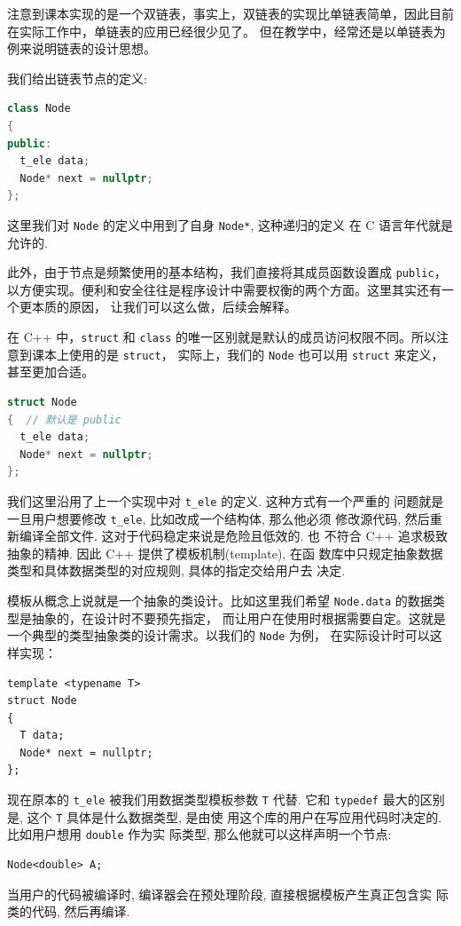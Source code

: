 \documentclass[a4paper]{ctexart}
\theoremstyle{definition}
\theoremstyle{definition}
\begin{document}
注意到课本实现的是一个双链表，事实上，双链表的实现比单链表简单，因此目前在实际工作中，单链表的应用已经很少见了。
但在教学中，经常还是以单链表为例来说明链表的设计思想。

我们给出链表节点的定义:
\begin{lstlisting}[language=C++]
class Node
{
public:
  t_ele data;
  Node* next = nullptr; 
};
\end{lstlisting}
这里我们对 \verb|Node| 的定义中用到了自身 \verb|Node*|, 这种递归的定义
在 C 语言年代就是允许的.

此外，由于节点是频繁使用的基本结构，我们直接将其成员函数设置成 \verb|public|，
以方便实现。便利和安全往往是程序设计中需要权衡的两个方面。这里其实还有一个更本质的原因，
让我们可以这么做，后续会解释。

在 C++ 中，\verb|struct| 和 \verb|class| 的唯一区别就是默认的成员访问权限不同。所以注意到课本上使用的是 \verb|struct|，
实际上，我们的 \verb|Node| 也可以用 \verb|struct| 来定义，甚至更加合适。

\begin{lstlisting}[language=C++]
struct Node
{  // 默认是 public
  t_ele data;
  Node* next = nullptr; 
};
\end{lstlisting}

我们这里沿用了上一个实现中对 \verb|t_ele| 的定义. 这种方式有一个严重的
问题就是一旦用户想要修改 \verb|t_ele|, 比如改成一个结构体, 那么他必须
修改源代码, 然后重新编译全部文件. 这对于代码稳定来说是危险且低效的. 也
不符合 C++ 追求极致抽象的精神. 因此 C++ 提供了模板机制(template), 在函
数库中只规定抽象数据类型和具体数据类型的对应规则, 具体的指定交给用户去
决定. 

模板从概念上说就是一个抽象的类设计。比如这里我们希望 \verb|Node.data| 的数据类型是抽象的，在设计时不要预先指定，
而让用户在使用时根据需要自定。这就是一个典型的类型抽象类的设计需求。以我们的 \verb|Node| 为例，
在实际设计时可以这样实现：
\begin{verbatim}
template <typename T>
struct Node
{
  T data;
  Node* next = nullptr; 
};
\end{verbatim}
现在原本的 \verb|t_ele| 被我们用数据类型模板参数 \verb|T| 代替. 它和
\verb|typedef| 最大的区别是, 这个 \verb|T| 具体是什么数据类型, 是由使
用这个库的用户在写应用代码时决定的. 比如用户想用 \verb|double| 作为实
际类型, 那么他就可以这样声明一个节点:
\begin{verbatim}
Node<double> A;
\end{verbatim}
当用户的代码被编译时, 编译器会在预处理阶段, 直接根据模板产生真正包含实
际类的代码, 然后再编译. 
\end{document}

